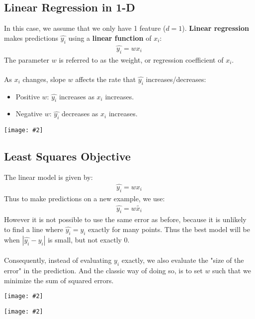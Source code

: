 \documentclass{article}
\def\blu#1{{\color{blu}#1}}
\def\gre#1{{\color{gre}#1}}
\def\red#1{{\color{red}#1}}
\theoremstyle{definition}
\newcommand{\centerfig}[2]{\begin{center}\texttt{[image: \#2]}\end{center}}
\begin{document}
\subsection*{Linear Regression in 1-D}
In this case, we assume that we only have 1 feature ($ d=1 $). \textbf{\blu{Linear regression}} makes predictions $ \hat{y_i} $ using a \textbf{\blu{linear function}} of $ x_i $:
\begin{align*}
\hat{y_i} = wx_i
\end{align*}
The parameter $ w $ is referred to as the \blu{weight}, or \blu{regression coefficient} of $ x_i $. \\ \\
As $ x_i $ changes, slope $ w $ affects the rate that $\hat{y_i}$ increases/decreases:
\begin{itemize}
	\item Positive $ w $: $\hat{y_i}$ increases as $ x_i $ increases.
	\item Negative $ w $: $\hat{y_i}$ decreases as $ x_i $ increases.
\end{itemize}
	\centerfig{0.70}{Pic29}
	
\subsection*{Least Squares Objective}
The \blu{linear model} is given by:
\begin{align*}
\hat{y_i} = wx_i
\end{align*}
Thus to make \blu{predictions} on a new example, we use:
\begin{align*}
\hat{y_i} = w\tilde{x_i}
\end{align*}
However it is \red{not possible to use the same error} as before, because it is \red{unlikely to find a line where $\hat{y_i} = y_i$ exactly} for many points. Thus the best model will be when \gre{$ |\hat{y_i} - y_i| $ is small}, but not exactly 0. \\ \\
Consequently, instead of evaluating $ y_i $ exactly, we also evaluate the \gre{"size of the error"} in the prediction. And the classic way of doing so, is to set $ w $ such that we minimize the \blu{sum of squared errors}.
\centerfig{0.80}{Pic31}
\centerfig{0.80}{Pic32}
	
	
\end{document}
